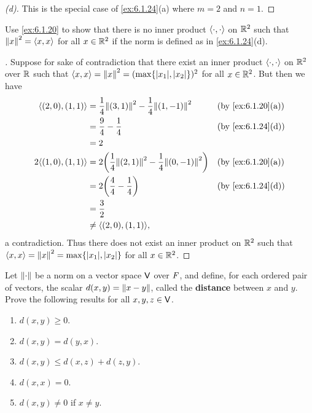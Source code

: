 \begin{proof}[(d)]
  This is the special case of \cref{ex:6.1.24}(a) where \(m = 2\) and \(n = 1\).
\end{proof}

\begin{ex}\label{ex:6.1.25}
  Use \cref{ex:6.1.20} to show that there is no inner product \(\left\langle\cdot, \cdot\right\rangle\) on \(\mathbb{R}^2\) such that \(\left\lVert x\right\rVert^2 = \left\langle x, x\right\rangle\) for all \(x \in \mathbb{R}^2\) if the norm is defined as in \cref{ex:6.1.24}(d).
\end{ex}

\begin{proof}[]
  Suppose for sake of contradiction that there exist an inner product \(\left\langle\cdot, \cdot\right\rangle\) on \(\mathbb{R}^2\) over \(\mathbb{R}\) such that \(\inn{x, x} = \norm{x}^2 = (\max\set{\abs{x_1}, \abs{x_2}})^2\) for all \(x \in \mathbb{R}^2\).
  But then we have
  \begin{align*}
    \inn{(2, 0), (1, 1)}   & = \frac{1}{4} \norm{(3, 1)}^2 - \frac{1}{4} \norm{(1, -1)}^2        &  & \by{ex:6.1.20}[a] \\
                           & = \frac{9}{4} - \frac{1}{4}                                         &  & \by{ex:6.1.24}[d] \\
                           & = 2                                                                                        \\
    2 \inn{(1, 0), (1, 1)} & = 2 \pa{\frac{1}{4} \norm{(2, 1)}^2 - \frac{1}{4} \norm{(0, -1)}^2} &  & \by{ex:6.1.20}[a] \\
                           & = 2 \pa{\frac{4}{4} - \frac{1}{4}}                                  &  & \by{ex:6.1.24}[d] \\
                           & = \frac{3}{2}                                                                              \\
                           & \neq \inn{(2, 0), (1, 1)},
  \end{align*}
  a contradiction.
  Thus there does not exist an inner product on \(\mathbb{R}^2\) such that \(\inn{x, x} = \norm{x}^2 = \max\set{\abs{x_1}, \abs{x_2}}\) for all \(x \in \mathbb{R}^2\).
\end{proof}

\begin{ex}\label{ex:6.1.26}
  Let \(\left\lVert\cdot\right\rVert\) be a norm on a vector space \(\mathsf{V}\) over \(\mathit{F}\), and define, for each ordered pair of vectors, the scalar \(d(x, y) = \left\lVert x - y\right\rVert\), called the \textbf{distance} between \(x\) and \(y\).
  Prove the following results for all \(x, y, z \in \mathsf{V}\).
  \begin{enumerate}
    \item \(d(x, y) \geq 0\).
    \item \(d(x, y) = d(y, x)\).
    \item \(d(x, y) \leq d(x, z) + d(z, y)\).
    \item \(d(x, x) = 0\).
    \item \(d(x, y) \neq 0\) if \(x \neq y\).
  \end{enumerate}
\end{ex}

